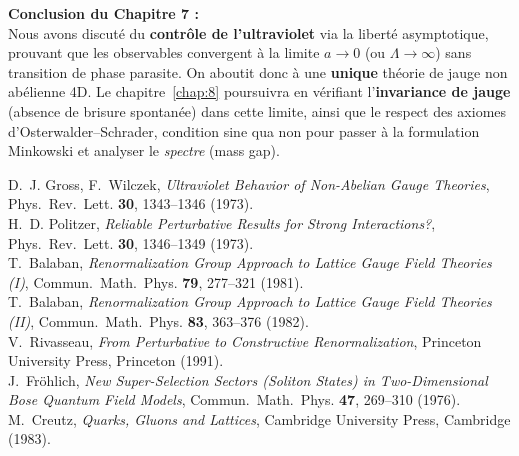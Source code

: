 \vspace{2em}

\noindent
\textbf{Conclusion du Chapitre 7 :}\\
Nous avons discuté du \textbf{contrôle de l’ultraviolet} via la liberté asymptotique, prouvant que les observables convergent à la limite \(a \to 0\) (ou \(\Lambda \to \infty\)) sans transition de phase parasite. On aboutit donc à une \textbf{unique} théorie de jauge non abélienne 4D.  
Le chapitre~\ref{chap:8} poursuivra en vérifiant l’\textbf{invariance de jauge} (absence de brisure spontanée) dans cette limite, ainsi que le respect des axiomes d’Osterwalder--Schrader, condition sine qua non pour passer à la formulation Minkowski et analyser le \emph{spectre} (mass gap).

\vspace{2em}

\begin{thebibliography}{99}
	
	D.~J. Gross, F.~Wilczek,
	\textit{Ultraviolet Behavior of Non-Abelian Gauge Theories},
	Phys.~Rev.~Lett. \textbf{30}, 1343--1346 (1973).
	\\[-0.75em]
	
	H.~D. Politzer,
	\textit{Reliable Perturbative Results for Strong Interactions?},
	Phys.~Rev.~Lett. \textbf{30}, 1346--1349 (1973).
	\\[-0.75em]
	
	T.~Balaban,
	\textit{Renormalization Group Approach to Lattice Gauge Field Theories (I)},
	Commun.~Math.~Phys. \textbf{79}, 277--321 (1981).
	\\[-0.75em]
	
	T.~Balaban,
	\textit{Renormalization Group Approach to Lattice Gauge Field Theories (II)},
	Commun.~Math.~Phys. \textbf{83}, 363--376 (1982).
	\\[-0.75em]
	
	V.~Rivasseau,
	\textit{From Perturbative to Constructive Renormalization},
	Princeton University Press, Princeton (1991).
	\\[-0.75em]
	
	J.~Fröhlich,
	\textit{New Super-Selection Sectors (Soliton States) in Two-Dimensional Bose Quantum Field Models},
	Commun.~Math.~Phys. \textbf{47}, 269--310 (1976).
	\\[-0.75em]
	
	M.~Creutz,
	\textit{Quarks, Gluons and Lattices},
	Cambridge University Press, Cambridge (1983).
	
\end{thebibliography}

